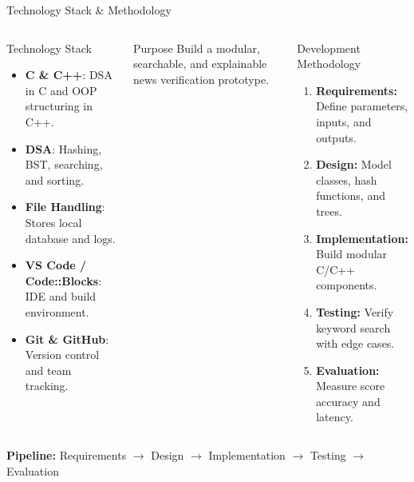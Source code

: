 \documentclass[aspectratio=169,10pt]{beamer}
\def\tightlistspacing{%
  \setlength{\itemsep}{1.2pt}%
  \setlength{\parsep}{0pt}%
  \setlength{\topsep}{1pt}%
  \setlength{\partopsep}{0pt}%
}
\begin{document}
\begin{frame}{Technology Stack \& Methodology}
\begin{columns}[T,totalwidth=\textwidth]
\begin{block}{Technology Stack}
\begin{itemize}\scriptsize\tightlistspacing\RaggedRight
\item \textbf{C \& C++}: DSA in C and OOP structuring in C++.
\item \textbf{DSA}: Hashing, BST, searching, and sorting.
\item \textbf{File Handling}: Stores local database and logs.
\item \textbf{VS Code / Code::Blocks}: IDE and build environment.
\item \textbf{Git \& GitHub}: Version control and team tracking.
\end{itemize}
\end{block}

\vspace{1.5mm}
\begin{block}{Purpose}
\scriptsize\RaggedRight
Build a modular, searchable, and explainable news verification prototype.
\end{block}

\begin{block}{Development Methodology}
\begin{enumerate}\scriptsize\tightlistspacing\RaggedRight
\item \textbf{Requirements:} Define parameters, inputs, and outputs.
\item \textbf{Design:} Model classes, hash functions, and trees.
\item \textbf{Implementation:} Build modular C/C++ components.
\item \textbf{Testing:} Verify keyword search with edge cases.
\item \textbf{Evaluation:} Measure score accuracy and latency.
\end{enumerate}
\end{block}
\end{columns}

\vspace{2mm}
\centering\tiny\textbf{Pipeline:} Requirements $\longrightarrow$ Design $\longrightarrow$ Implementation $\longrightarrow$ Testing $\longrightarrow$ Evaluation
\end{frame}
\end{document}
